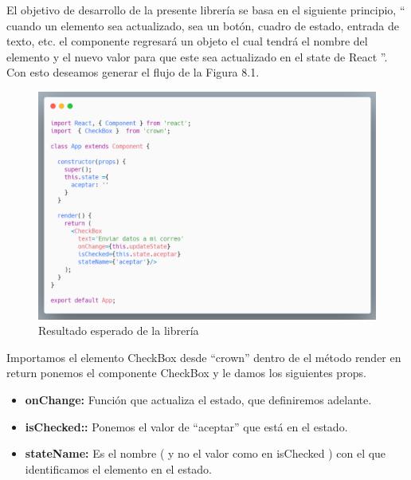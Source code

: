        El objetivo de desarrollo de la presente librería se basa en el siguiente principio, “ cuando un elemento sea actualizado, sea un botón, cuadro de estado, entrada de texto, etc. el componente regresará un objeto el cual tendrá el nombre del elemento y el nuevo valor para que este sea actualizado en el state de React ”.  Con esto deseamos generar el  flujo de la Figura 8.1.
        
               \begin{figure}[H]
           \includegraphics[width=1\textwidth]{./Imagenes/carbon-8.png}
           \caption[Resultado esperado de la librería]{Resultado esperado de la librería}
             \end{figure}
        
        Importamos el elemento CheckBox desde “crown” dentro de el método render en return  ponemos el componente CheckBox y le damos los  siguientes  props.
        
        \begin{itemize}
        	\item \textbf{onChange:} Función que actualiza el estado, que definiremos adelante.
        	\item \textbf{isChecked::} Ponemos el valor de “aceptar” que está en el estado.
        	\item \textbf{stateName:}  Es el nombre ( y no el valor como en isChecked ) con el que identificamos el elemento en el estado. 
        \end{itemize}
        
